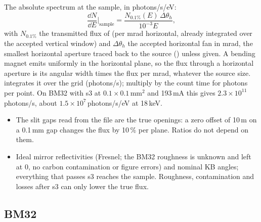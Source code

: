 The absolute spectrum at the sample, in photons/s/eV:
\begin{equation}
  \frac{\dd N}{\dd E}\bigg|_\mathrm{sample} = \frac{N_{0.1\%}(E)\,\Delta\theta_h}{10^{-3}E},
\end{equation}
with $N_{0.1\%}$ the transmitted flux of  (per mrad horizontal, already
integrated over the accepted vertical window) and $\Delta\theta_h$ the accepted horizontal fan
in mrad, the smallest horizontal aperture traced back to the source
() unless given. A bending magnet emits uniformly in the
horizontal plane, so the flux through a horizontal aperture is its angular width times the flux
per mrad, whatever the source size.  integrates it over the grid (photons/s);
multiply by the count time for photons per point. On BM32 with s3 at
$0.1\times0.1$\,mm$^2$ and 193\,mA this gives $2.3\times10^{11}$\,photons/s, about
$1.5\times10^{7}$\,photons/s/eV at 18\,keV.
\begin{hyp}
\begin{itemize}[nosep,leftmargin=1em]
\item The slit gaps read from the file are the true openings: a zero offset of 10\,\textmu m on a
  0.1\,mm gap changes the flux by 10\,\% per plane. Ratios do not depend on them.
\item Ideal mirror reflectivities (Fresnel; the BM32 roughness is unknown and left at 0, no
  carbon contamination or figure errors) and nominal KB angles; everything that passes s3
  reaches the sample. Roughness, contamination and losses after s3 can only lower the true
  flux.
\end{itemize}
\end{hyp}

\subsection{BM32}

